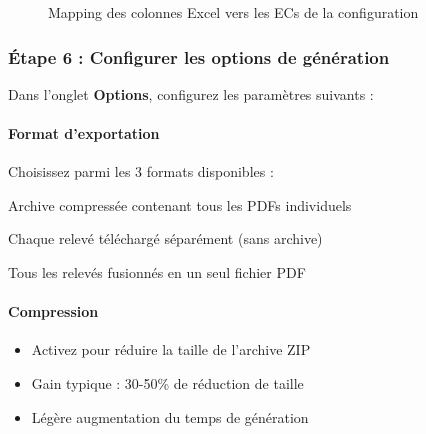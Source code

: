 \begin{figure}[h]
    \centering
    \caption{Mapping des colonnes Excel vers les ECs de la configuration}
\end{figure}


\subsubsection{Étape 6 : Configurer les options de génération}

Dans l'onglet \textbf{Options}, configurez les paramètres suivants :

\paragraph{Format d'exportation}

Choisissez parmi les 3 formats disponibles :

\begin{description}[leftmargin=3.5cm]
    \item[ZIP (défaut)] Archive compressée contenant tous les PDFs individuels
    \item[Fichiers individuels] Chaque relevé téléchargé séparément (sans archive)
    \item[PDF unique] Tous les relevés fusionnés en un seul fichier PDF
\end{description}

\paragraph{Compression}

\begin{itemize}[leftmargin=*]
    \item Activez  pour réduire la taille de l'archive ZIP
    \item Gain typique : 30-50\% de réduction de taille
    \item Légère augmentation du temps de génération
\end{itemize}

